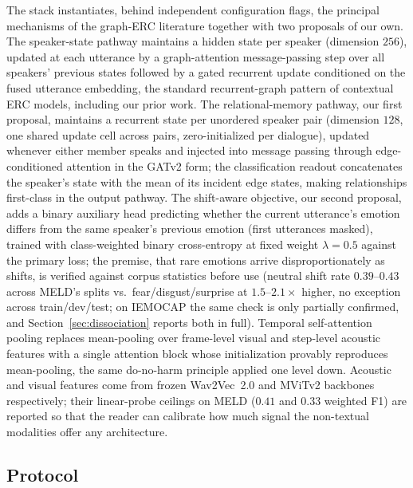 The stack instantiates, behind independent configuration flags, the principal mechanisms of the graph-ERC literature together with two proposals of our own. The speaker-state pathway maintains a hidden state per speaker (dimension $256$), updated at each utterance by a graph-attention message-passing step over all speakers' previous states followed by a gated recurrent update conditioned on the fused utterance embedding, the standard recurrent-graph pattern of contextual ERC models, including our prior work. The relational-memory pathway, our first proposal, maintains a recurrent state per unordered speaker pair (dimension $128$, one shared update cell across pairs, zero-initialized per dialogue), updated whenever either member speaks and injected into message passing through edge-conditioned attention in the GATv2 form; the classification readout concatenates the speaker's state with the mean of its incident edge states, making relationships first-class in the output pathway. The shift-aware objective, our second proposal, adds a binary auxiliary head predicting whether the current utterance's emotion differs from the same speaker's previous emotion (first utterances masked), trained with class-weighted binary cross-entropy at fixed weight $\lambda{=}0.5$ against the primary loss; the premise, that rare emotions arrive disproportionately as shifts, is verified against corpus statistics before use (neutral shift rate $0.39$--$0.43$ across MELD's splits vs.\ fear/disgust/surprise at $1.5$--$2.1\times$ higher, no exception across train/dev/test; on IEMOCAP the same check is only partially confirmed, and Section~\ref{sec:dissociation} reports both in full). Temporal self-attention pooling replaces mean-pooling over frame-level visual and step-level acoustic features with a single attention block whose initialization provably reproduces mean-pooling, the same do-no-harm principle applied one level down. Acoustic and visual features come from frozen Wav2Vec~2.0 and MViTv2 backbones respectively; their linear-probe ceilings on MELD ($0.41$ and $0.33$ weighted F1) are reported so that the reader can calibrate how much signal the non-textual modalities offer any architecture.

\subsection{Protocol}
\label{sec:protocol}

